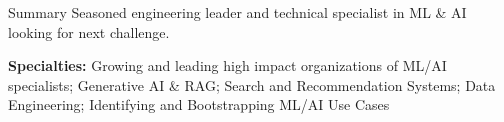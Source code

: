 \documentclass{resume} %
\begin{document}

\begin{rSection}{Summary}
Seasoned engineering leader and technical specialist in ML \& AI looking for next challenge.

{\bf Specialties:} Growing and leading high impact organizations of ML/AI specialists; Generative AI \& RAG; Search and Recommendation Systems; Data Engineering; Identifying and Bootstrapping ML/AI Use Cases

\end{rSection}

\end{document}

